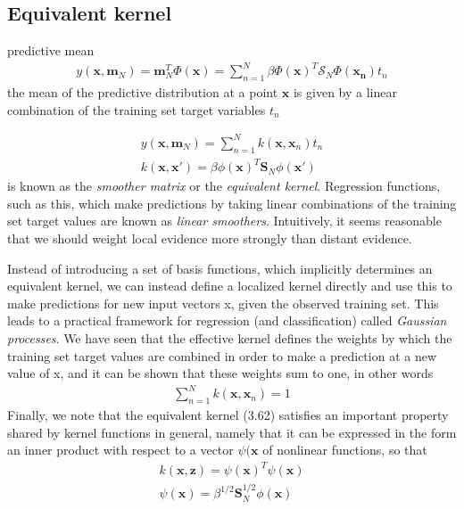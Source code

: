 \documentclass[a4paper]{article}
\begin{document}
\subsection{Equivalent kernel}
predictive mean
\begin{align}
y(\mathbf{x},\mathbf{m}_N) = \mathbf{m}_N^T \Phi(\mathbf{x}) =
\displaystyle\sum_{n=1}^{N} \beta \Phi(\mathbf{x})^T \mathcal{S}_N \Phi(\mathbf{x_n}) t_n
\end{align}
the mean of the predictive distribution at a point
$ \mathbf{x} $ is given by a linear combination of the training set target
variables $ t_n $



\begin{align}
y(\mathbf{x},\mathbf{m}_N) =
\displaystyle\sum_{n=1}^{N} k(\mathbf{x},\mathbf{x}_n) t_n
\\
 k(\mathbf{x},\mathbf{x}') = \beta \phi(\mathbf{x})^T \mathbf{S}_N \phi(\mathbf{x'})
\end{align}
is known as the \textit{smoother matrix} or the \textit{equivalent
  kernel}. Regression functions, such
as this, which make predictions by taking linear combinations of the training set
target values are known as \textit{linear smoothers}. Intuitively, it seems reasonable
that we should weight local evidence more strongly than distant evidence.

Instead of introducing a set of basis
functions, which implicitly determines an equivalent kernel, we can instead define
a localized kernel directly and use this to make predictions for new input vectors x,
given the observed training set. This leads to a practical framework for regression
(and classification) called \textit{Gaussian processes}.
We have seen that the effective kernel defines the weights by which the training
set target values are combined in order to make a prediction at a new value of x, and
it can be shown that these weights sum to one, in other words
\begin{align}
\displaystyle\sum_{n=1}^{N} k(\mathbf{x},\mathbf{x}_n) = 1
\end{align}
Finally, we note that the equivalent kernel (3.62) satisfies an
important property shared by kernel functions in general, namely that
it can be expressed in the form an inner product with respect to a
vector $ \psi(\mathbf{x} $ of nonlinear functions, so that
\begin{align}
k(\mathbf{x},\mathbf{z}) = \psi(\mathbf{x})^T\psi(\mathbf{x})
\\
\psi(\mathbf{x}) = \beta^{1/2} \mathbf{S}_N^{1/2} \phi(\mathbf{x})
\end{align}
\end{document}
